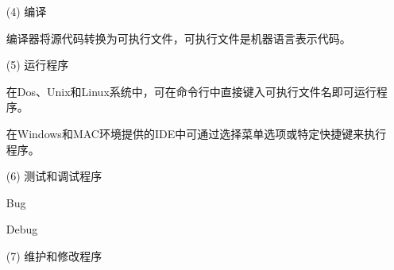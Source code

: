 \begin{frame}\ft{\secname}
  \begin{itemize}
  \item[(4)] 编译 \\[0.1in]
  \item[] 编译器将源代码转换为可执行文件，可执行文件是机器语言表示代码。\\[0.2in]
  \item[(5)] 运行程序 \\[0.1in]
  \item[] 在Dos、Unix和Linux系统中，可在命令行中直接键入可执行文件名即可运行程序。\\[0.1in]
  \item[] 在Windows和MAC环境提供的IDE中可通过选择菜单选项或特定快捷键来执行程序。 
  \end{itemize} 
  
\end{frame}

\begin{frame}[fragile]\ft{\secname}
  \begin{itemize}
  \item[(6)] 测试和调试程序\\[0.1in]
  \item[] Bug\\[0.1in]
  \item[] Debug\\[0.2in]

  \item[(7)]  维护和修改程序\\[0.1in]
  \end{itemize} 
  
\end{frame}



